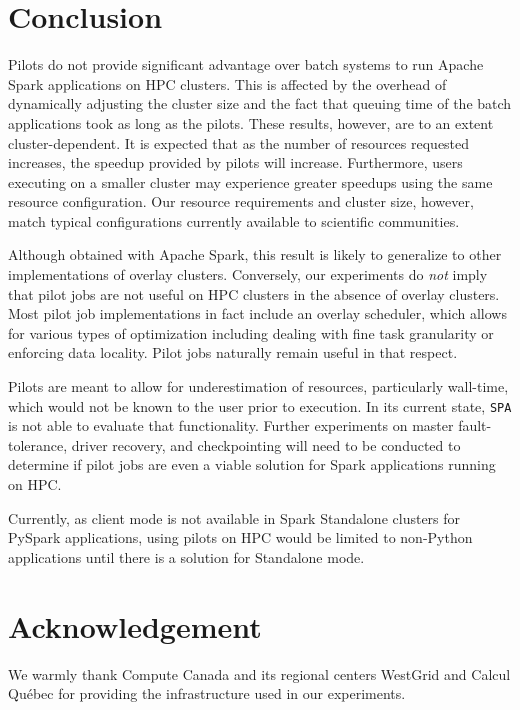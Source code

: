 \documentclass{IEEEtran}
\begin{document}
\section{Conclusion}\label{sec:conclusion}
Pilots do not provide significant advantage over batch systems to run
Apache Spark applications on HPC clusters. This is affected by the overhead of dynamically
adjusting the cluster size and the fact that queuing time of the batch
applications took as long as the pilots. These results, however, are to an
extent cluster-dependent. It is expected that as the number of resources
requested increases, the speedup provided by pilots will increase.
Furthermore, users executing on a smaller cluster may experience greater
speedups using the same resource configuration. Our resource requirements
and cluster size, however, match typical configurations currently available
to scientific communities.

Although obtained with Apache Spark, this result is likely to generalize to
other implementations of overlay clusters. Conversely, our experiments do
\emph{not} imply that pilot jobs are not useful on HPC clusters in the
absence of overlay clusters. Most pilot job implementations in fact include
an overlay scheduler, which allows for various types of optimization
including dealing with fine task granularity or enforcing data locality.
Pilot jobs naturally remain useful in that respect.

Pilots are meant to allow for underestimation of resources, particularly
wall-time, which would not be known to the user prior to execution. In its
current state, \texttt{SPA} is not able to evaluate that functionality.
Further experiments on master fault-tolerance, driver recovery, and
checkpointing will need to be conducted to determine if pilot jobs are even
a viable solution for Spark applications running on HPC.

Currently, as client mode is not available in Spark Standalone clusters for
PySpark applications, using pilots on HPC would be limited to non-Python
applications until there is a solution for Standalone mode.

\section*{Acknowledgement}

We warmly thank Compute Canada and its regional centers WestGrid and Calcul
Qu\'ebec for providing the infrastructure used in our experiments.

 

\end{document}
